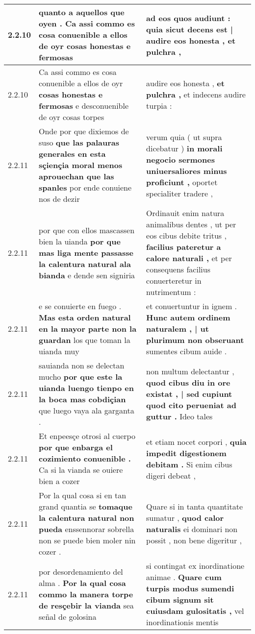 \begin{tabular}{|p{1cm}|p{6.5cm}|p{6.5cm}|}
2.2.10 & quanto a aquellos que oyen . \textbf{ Ca assi commo es cosa conuenible a ellos de oyr } cosas honestas e fermosas & ad eos quos audiunt : \textbf{ quia sicut decens est | audire eos honesta , } et pulchra , \\\hline
2.2.10 & Ca assi commo es cosa conuenible a ellos de oyr \textbf{ cosas honestas e fermosas } e desconuenible de oyr cosas torpes & audire eos honesta , \textbf{ et pulchra , } et indecens audire turpia : \\\hline
2.2.11 & Onde por que dixiemos de suso \textbf{ que las palauras generales en esta sçiençia moral menos aprouechan que las spanles } por ende conuiene nos de dezir & verum quia ( ut supra dicebatur ) \textbf{ in morali negocio sermones uniuersaliores minus proficiunt , } oportet specialiter tradere , \\\hline
2.2.11 & por que con ellos mascassen bien la uianda \textbf{ por que mas liga mente passasse la calentura natural ala bianda } e dende sen signiria & Ordinauit enim natura animalibus dentes , ut per eos cibus debite tritus , \textbf{ facilius pateretur a calore naturali , } et per consequens facilius conuerteretur in nutrimentum : \\\hline
2.2.11 & e se conuierte en fuego . \textbf{ Mas esta orden natural en la mayor parte non la guardan } los que toman la uianda muy & et conuertuntur in ignem . \textbf{ Hunc autem ordinem naturalem , | ut plurimum non obseruant } sumentes cibum auide . \\\hline
2.2.11 & sauianda non se delectan mucho \textbf{ por que este la uianda luengo tienpo en la boca mas cobdiçian } que luego vaya ala garganta . & non multum delectantur , \textbf{ quod cibus diu in ore existat , | sed cupiunt quod cito perueniat ad guttur . } Ideo tales \\\hline
2.2.11 & Et enpeesçe otrosi al cuerpo \textbf{ por que enbarga el cozimiento conuenible . } Ca si la vianda se ouiere bien a cozer & et etiam nocet corpori , \textbf{ quia impedit digestionem debitam . } Si enim cibus digeri debeat , \\\hline
2.2.11 & Por la qual cosa si en tan grand quantia se \textbf{ tomaque la calentura natural non pueda } enssennorar sobrella non se puede bien moler nin cozer . & Quare si in tanta quantitate sumatur , \textbf{ quod calor naturalis } ei dominari non possit , non bene digeritur , \\\hline
2.2.11 & por desordenamiento del alma . \textbf{ Por la qual cosa commo la manera torpe de resçebir la vianda } sea señal de golosina & si contingat ex inordinatione animae . \textbf{ Quare cum turpis modus sumendi cibum signum sit cuiusdam gulositatis , } vel inordinationis mentis \\\hline

\end{tabular}
